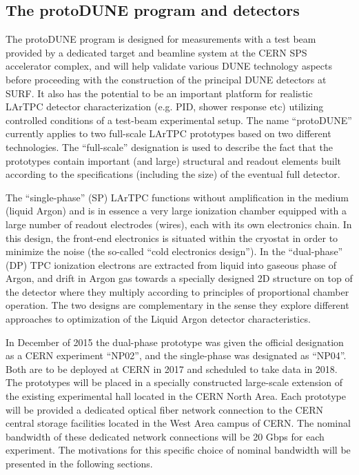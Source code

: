 \subsection{The protoDUNE program and detectors}
The protoDUNE program is designed for measurements with a test beam provided by a dedicated target and beamline system at the CERN SPS accelerator complex, and will help validate various DUNE technology aspects before proceeding with the construction of the principal DUNE detectors at SURF. It also has the potential to be an important platform for realistic LArTPC detector characterization (e.g. PID, shower response etc) utilizing controlled conditions of a test-beam experimental setup. The name ``protoDUNE'' currently applies to two full-scale LArTPC prototypes based on two different technologies. The ``full-scale'' designation is used to describe the fact that the prototypes contain important (and large) structural and readout elements built according to the specifications (including the size) of the eventual full detector.

The  ``single-phase'' (SP) LArTPC functions without amplification in the medium (liquid Argon) and is in essence a very large ionization chamber equipped with a large number of readout electrodes (wires), each with its own electronics chain. In this design, the front-end electronics is situated within the cryostat in order to minimize the noise (the so-called ``cold electronics design''). In the ``dual-phase'' (DP) TPC ionization electrons are extracted from liquid into gaseous phase of Argon, and drift in Argon gas towards a specially designed 2D structure on top of the detector where they multiply according to principles of proportional chamber operation. The two designs are complementary in the sense they explore different approaches to optimization of the Liquid Argon detector characteristics.

In December of 2015 the dual-phase prototype was given the official designation as a CERN experiment ``NP02'', and the single-phase was designated as ``NP04''. Both are to be deployed at CERN in 2017 and scheduled to take data in 2018. The prototypes will be placed in a specially constructed large-scale extension of the existing experimental hall located in the CERN North Area. Each prototype will be provided a dedicated optical fiber network connection to the CERN central storage facilities located in the West Area campus of CERN. The nominal bandwidth of these dedicated network connections will be 20 Gbps for each experiment. The motivations for this specific choice of nominal bandwidth will be presented in the following sections.


